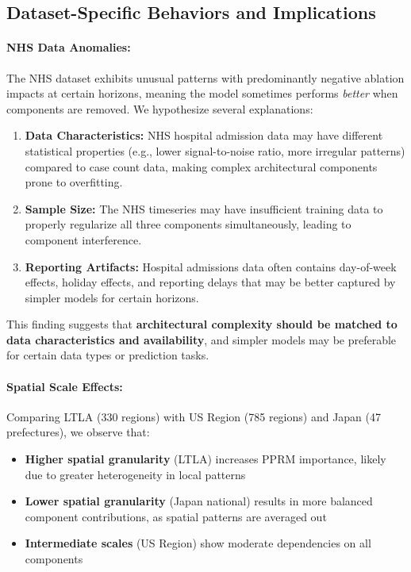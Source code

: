 \documentclass[11pt,a4paper]{article}
\begin{document}
\subsection{Dataset-Specific Behaviors and Implications}

\paragraph{NHS Data Anomalies:} The NHS dataset exhibits unusual patterns with predominantly negative ablation impacts at certain horizons, meaning the model sometimes performs \textit{better} when components are removed. We hypothesize several explanations:

\begin{enumerate}
    \item \textbf{Data Characteristics:} NHS hospital admission data may have different statistical properties (e.g., lower signal-to-noise ratio, more irregular patterns) compared to case count data, making complex architectural components prone to overfitting.
    
    \item \textbf{Sample Size:} The NHS timeseries may have insufficient training data to properly regularize all three components simultaneously, leading to component interference.
    
    \item \textbf{Reporting Artifacts:} Hospital admissions data often contains day-of-week effects, holiday effects, and reporting delays that may be better captured by simpler models for certain horizons.
\end{enumerate}

This finding suggests that \textbf{architectural complexity should be matched to data characteristics and availability}, and simpler models may be preferable for certain data types or prediction tasks.

\paragraph{Spatial Scale Effects:} Comparing LTLA (330 regions) with US Region (785 regions) and Japan (47 prefectures), we observe that:

\begin{itemize}
    \item \textbf{Higher spatial granularity} (LTLA) increases PPRM importance, likely due to greater heterogeneity in local patterns
    \item \textbf{Lower spatial granularity} (Japan national) results in more balanced component contributions, as spatial patterns are averaged out
    \item \textbf{Intermediate scales} (US Region) show moderate dependencies on all components
\end{itemize}
\end{document}
